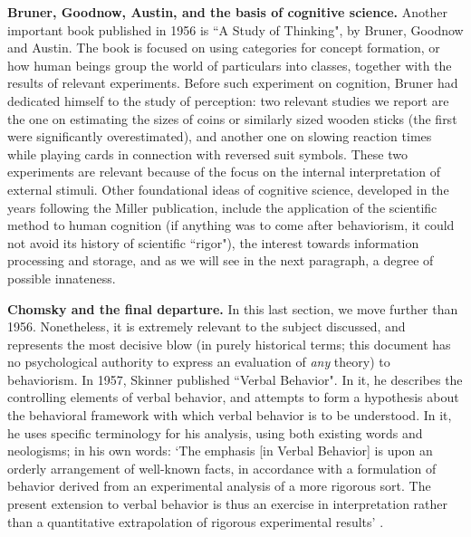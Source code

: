 \documentclass[../main.tex]{subfiles}
\begin{document}
\vspace{4pt}
\textbf{Bruner, Goodnow, Austin, and the basis of cognitive science.}
Another important book published in 1956 is ``A Study of Thinking", by Bruner, Goodnow and Austin. The book is focused on using categories for concept formation, or how human beings group the world of particulars into classes, together with the results of relevant experiments. Before such experiment on cognition, Bruner had dedicated himself to the study of perception: two relevant studies we report are the one on estimating the sizes of coins or similarly sized wooden sticks (the first were significantly overestimated), and another one on slowing reaction times while playing cards in connection with reversed suit symbols. These two experiments are relevant because of the focus on the internal interpretation of external stimuli. Other foundational ideas of cognitive science, developed in the years following the Miller publication, include the application of the scientific method to human cognition (if anything was to come after behaviorism, it could not avoid its history of scientific ``rigor"), the interest towards information processing and storage, and as we will see in the next paragraph, a degree of possible innateness.

\vspace{4pt}
\textbf{Chomsky and the final departure.}
In this last section, we move further than 1956. Nonetheless, it is extremely relevant to the subject discussed, and represents the most decisive blow (in purely historical terms; this document has no psychological authority to express an evaluation of \textit{any} theory) to behaviorism. In 1957, Skinner published ``Verbal Behavior". In it, he describes the controlling elements of verbal behavior, and attempts to form a hypothesis about the behavioral framework with which verbal behavior is to be understood. In it, he uses specific terminology for his analysis, using both existing words and neologisms; in his own words: \enquote*{The emphasis [in Verbal Behavior] is upon an orderly arrangement of well-known facts, in accordance with a formulation of behavior derived from an experimental analysis of a more rigorous sort. The present extension to verbal behavior is thus an exercise in interpretation rather than a quantitative extrapolation of rigorous experimental results} \parencite{skinnerVerbalBehavior1957}.
\end{document}
